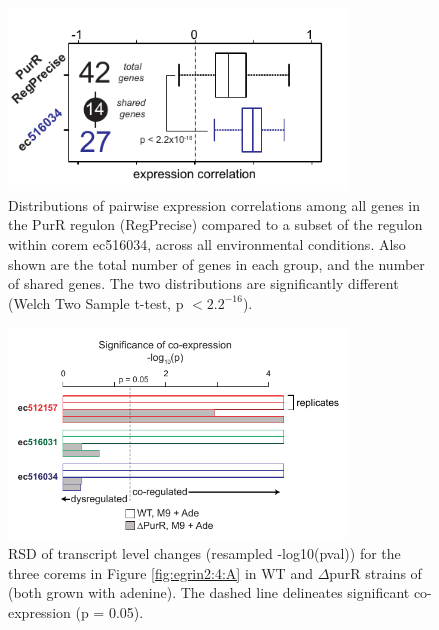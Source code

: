 \begin{figure}[h!]
    \centering
    \includegraphics[width=0.8\textwidth]{figures/egrin2_ecoli_expression_cor}
 	\caption[Transcriptional evidence for subdivision of regulons by corems]{Distributions of pairwise expression correlations among all genes in the PurR regulon (RegPrecise) compared to a subset of the regulon within corem ec516034, across all environmental conditions. Also shown are the total number of genes in each group, and the number of shared genes. The two distributions are significantly different (Welch Two Sample t-test, p $< 2.2^{-16}$).
}
    \label{fig:egrin2:5:A}
\end{figure}

\begin{figure}[h!]
    \centering
    \includegraphics[width=0.8\textwidth]{figures/egrin2_ecoli_ko_expression}
 	\caption[Corems with predicted influence from PurR (GRE \#4) are disrupted in $\Delta$purR mutant]{RSD of transcript level changes (resampled -log10(pval)) for the three corems in Figure \ref{fig:egrin2:4:A} in WT and $\Delta$purR strains of \eco (both grown with adenine). The dashed line delineates significant co-expression (p = 0.05). 
}
    \label{fig:egrin2:5:B}
\end{figure}

